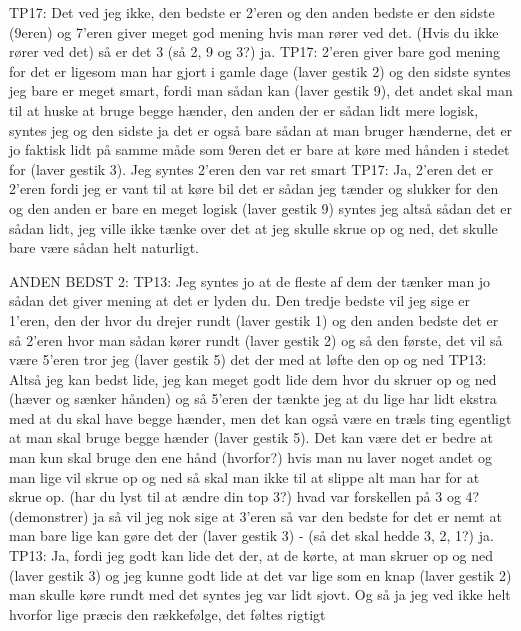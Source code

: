 TP17: Det ved jeg ikke, den bedste er 2’eren og den anden bedste er den sidste (9eren) og 7’eren giver meget god mening hvis man rører ved det.  (Hvis du ikke rører ved det) så er det 3 (så 2, 9 og 3?) ja.
TP17: 2’eren giver bare god mening for det er ligesom man har gjort i gamle dage (laver gestik 2) og den sidste syntes jeg bare er meget smart, fordi man sådan kan (laver gestik 9), det andet skal man til at huske at bruge begge hænder, den anden der er sådan lidt mere logisk, syntes jeg og den sidste ja det er også bare sådan at man bruger hænderne, det er jo faktisk lidt på samme måde som 9eren det er bare at køre med hånden i stedet for (laver gestik 3). Jeg syntes 2’eren den var ret smart
TP17: Ja, 2’eren det er 2’eren fordi jeg er vant til at køre bil det er sådan jeg tænder og slukker for den og den anden er bare en meget logisk (laver gestik 9) syntes jeg altså sådan det er sådan lidt, jeg ville ikke tænke over det at jeg skulle skrue op og ned, det skulle bare være sådan helt naturligt.

ANDEN BEDST 2: 
TP13: Jeg syntes jo at de fleste af dem der tænker man jo sådan det giver mening at det er lyden du. Den tredje bedste vil jeg sige er 1’eren, den der hvor du drejer rundt (laver gestik 1) og den anden bedste det er så 2’eren hvor man sådan kører rundt (laver gestik 2) og så den første, det vil så være 5’eren tror jeg (laver gestik 5) det der med at løfte den op og ned 
TP13: Altså jeg kan bedst lide, jeg kan meget godt lide dem hvor du skruer op og ned (hæver og sænker hånden) og så 5’eren der tænkte jeg at du lige har lidt ekstra med at du skal have begge hænder, men det kan også være en træls ting egentligt at man skal bruge begge hænder (laver gestik 5). Det kan være det er bedre at man kun skal bruge den ene hånd (hvorfor?) hvis man nu laver noget andet og man lige vil skrue op og ned så skal man ikke til at slippe alt man har for at skrue op. (har du lyst til at ændre din top 3?) hvad var forskellen på 3 og 4? (demonstrer) ja så vil jeg nok sige at 3’eren så var den bedste for det er nemt at man bare lige kan gøre det der (laver gestik 3) - (så det skal hedde 3, 2, 1?) ja.  
TP13: Ja, fordi jeg godt kan lide det der, at de kørte, at man skruer op og ned (laver gestik 3) og jeg kunne godt lide at det var lige som en knap (laver gestik 2) man skulle køre rundt med det syntes jeg var lidt sjovt. Og så ja jeg ved ikke helt hvorfor lige præcis den rækkefølge, det føltes rigtigt  

